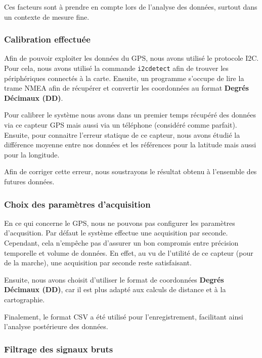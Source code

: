 Ces facteurs sont à prendre en compte lors de l’analyse des données, surtout dans un contexte de mesure fine.

\vspace{1em}
\subsubsection*{Calibration effectuée}

Afin de pouvoir exploiter les données du GPS, nous avons utilisé le protocole I2C. Pour cela, nous avons  utilisé la commande \texttt{i2cdetect} afin de trouver les périphériques connectés à la carte. Ensuite, un programme s'occupe de lire la trame NMEA afin de récupérer et convertir les coordonnées au format \textbf{Degrés Décimaux (DD)}. 

Pour calibrer le système nous avons dans un premier temps récupéré des données via ce capteur GPS mais aussi via un téléphone (considéré comme parfait). Ensuite, pour connaitre l'erreur statique de ce capteur, nous avons étudié la différence moyenne entre nos données et les références pour la latitude mais aussi pour la longitude.

Afin de corriger cette erreur, nous soustrayons le résultat obtenu à l'ensemble des futures données. 

\vspace{1em}
\subsubsection*{Choix des paramètres d’acquisition}

En ce qui concerne le GPS, nous ne pouvons pas configurer les paramètres d'acqusition. Par défaut le système effectue une acquisition par seconde. Cependant, cela n'empêche pas d'assurer un bon compromis entre précision temporelle et volume de données. En effet, au vu de l'utilité de ce capteur (pour de la marche), une acquisition par seconde reste satisfaisant. 

Ensuite, nous avons choisit d'utiliser le format de coordonnées \textbf{Degrés Décimaux (DD)}, car il est plus adapté aux calculs de distance et à la cartographie. 

Finalement, le format CSV a été utilisé pour l’enregistrement, facilitant ainsi l’analyse postérieure des données.

\vspace{1em}
\subsubsection*{Filtrage des signaux bruts}

